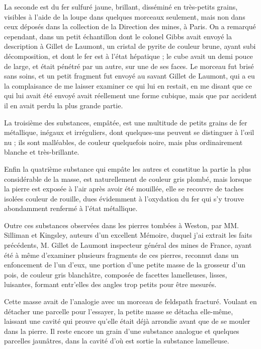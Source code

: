 \documentclass[a4paper, 12pt, oneside, french]{article}
\begin{document}
La seconde est du fer sulfuré jaune, brillant, disséminé en très-petits grains, visibles à l'aide de la loupe dans quelques morceaux seulement, mais non dans ceux déposés dans la collection de la Direction des mines, à Paris. On a remarqué cependant, dans un petit échantillon dont le colonel Gibbs avait envoyé la description à Gillet de Laumont, un cristal de pyrite de couleur brune, ayant subi décomposition, et dont le fer est à l'état hépatique ; le cube avait un demi pouce de large, et était pénétré par un autre, sur une de ses faces. Le morceau fut brisé sans soins, et un petit fragment fut envoyé au savant Gillet de Laumont, qui a eu la complaisance de me laisser examiner ce qui lui en restait, en me disant que ce qui lui avait été envoyé avait réellement une forme cubique, mais que par accident il en avait perdu la plus grande partie.

La troisième des substances, empâtée, est une multitude de petits grains de fer métallique, inégaux et irréguliers, dont quelques-uns peuvent se distinguer à l'œil nu ; ils sont malléables, de couleur quelquefois noire, mais plus ordinairement blanche et très-brillante.

Enfin la quatrième substance qui empâte les autres et constitue la partie la plus considérable de la masse, est naturellement de couleur gris plombé, mais lorsque la pierre est exposée à l'air après avoir été mouillée, elle se recouvre de taches isolées couleur de rouille, dues évidemment à l'oxydation du fer qui s'y trouve abondamment renfermé à l'état métallique.

Outre ces substances observées dans les pierres tombées à Weston, par MM. Silliman et Kingsley, auteurs d'un excellent Mémoire, duquel j'ai extrait les faits précédents, M. Gillet de Laumont inspecteur général des mines de France, ayant été à même d'examiner plusieurs fragments de ces pierres, reconnut dans un enfoncement de l'un d'eux, une portion d'une petite masse de la grosseur d'un pois, de couleur gris blanchâtre, composée de facettes lamelleuses, lisses, luisantes, formant entr'elles des angles trop petits pour être mesurés.

Cette masse avait de l'analogie avec un morceau de feldspath fracturé. Voulant en détacher une parcelle pour l'essayer, la petite masse se détacha elle-même, laissant une cavité qui prouve qu'elle était déjà arrondie avant que de se mouler dans la pierre. Il reste encore un grain d'une substance analogue et quelques parcelles jaunâtres, dans la cavité d'où est sortie la substance lamelleuse.
\end{document}
